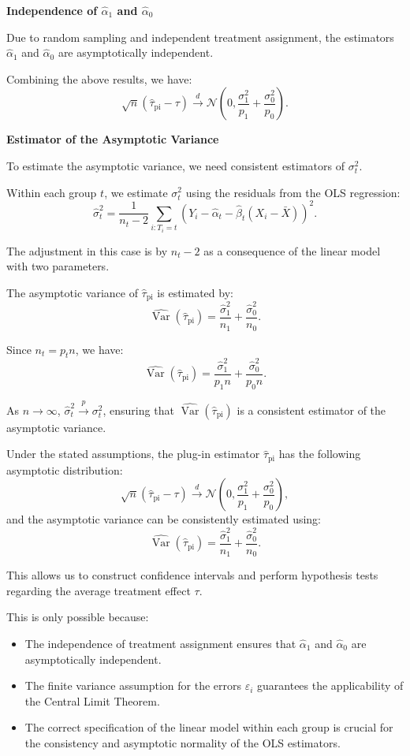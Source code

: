 \documentclass{article}
\begin{document}
\textbf{Independence of $\hat{\alpha}_1$ and $\hat{\alpha}_0$}

Due to random sampling and independent treatment assignment, the estimators $\hat{\alpha}_1$ and $\hat{\alpha}_0$ are asymptotically independent.

Combining the above results, we have:
\[
\sqrt{n} (\hat{\tau}_{\text{pi}} - \tau) \xrightarrow{d} \mathcal{N}\left(0, \frac{\sigma_1^2}{p_1} + \frac{\sigma_0^2}{p_0}\right).
\]

\textbf{Estimator of the Asymptotic Variance}

To estimate the asymptotic variance, we need consistent estimators of $\sigma_t^2$.

Within each group $t$, we estimate $\sigma_t^2$ using the residuals from the OLS regression:
\[
\hat{\sigma}_t^2 = \frac{1}{n_t - 2} \sum_{i:T_i = t} \left( Y_i - \hat{\alpha}_t - \hat{\beta}_t (X_i - \bar{X}) \right)^2.
\]

The adjustment in this case is by $n_t - 2$ as a consequence of the linear model with two parameters.

The asymptotic variance of $\hat{\tau}_{\text{pi}}$ is estimated by:
\[
\widehat{\operatorname{Var}}(\hat{\tau}_{\text{pi}}) = \frac{\hat{\sigma}_1^2}{n_1} + \frac{\hat{\sigma}_0^2}{n_0}.
\]

Since $n_t = p_t n$, we have:
\[
\widehat{\operatorname{Var}}(\hat{\tau}_{\text{pi}}) = \frac{\hat{\sigma}_1^2}{p_1 n} + \frac{\hat{\sigma}_0^2}{p_0 n}.
\]

As $n \to \infty$, $\hat{\sigma}_t^2 \xrightarrow{p} \sigma_t^2$, ensuring that $\widehat{\operatorname{Var}}(\hat{\tau}_{\text{pi}})$ is a consistent estimator of the asymptotic variance.

Under the stated assumptions, the plug-in estimator $\hat{\tau}_{\text{pi}}$ has the following asymptotic distribution:
\[
\sqrt{n} (\hat{\tau}_{\text{pi}} - \tau) \xrightarrow{d} \mathcal{N}\left(0, \frac{\sigma_1^2}{p_1} + \frac{\sigma_0^2}{p_0}\right),
\]
and the asymptotic variance can be consistently estimated using:
\[
\widehat{\operatorname{Var}}(\hat{\tau}_{\text{pi}}) = \frac{\hat{\sigma}_1^2}{n_1} + \frac{\hat{\sigma}_0^2}{n_0}.
\]

This allows us to construct confidence intervals and perform hypothesis tests regarding the average treatment effect $\tau$.

This is only possible because:

\begin{itemize}
    \item The independence of treatment assignment ensures that $\hat{\alpha}_1$ and $\hat{\alpha}_0$ are asymptotically independent.
    \item The finite variance assumption for the errors $\varepsilon_i$ guarantees the applicability of the Central Limit Theorem.
    \item The correct specification of the linear model within each group is crucial for the consistency and asymptotic normality of the OLS estimators.
\end{itemize}
\end{document}
